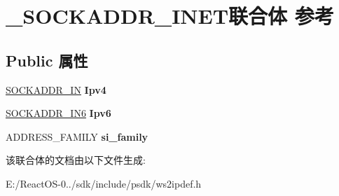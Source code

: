 \hypertarget{union___s_o_c_k_a_d_d_r___i_n_e_t}{}\section{\+\_\+\+S\+O\+C\+K\+A\+D\+D\+R\+\_\+\+I\+N\+E\+T联合体 参考}
\label{union___s_o_c_k_a_d_d_r___i_n_e_t}
\subsection*{Public 属性}
\begin{DoxyCompactItemize}
\item 
\mbox{\label{union___s_o_c_k_a_d_d_r___i_n_e_t_a7d04e6a93115bb74b94e188dc498d421}} 
\hyperlink{structsockaddr__in}{S\+O\+C\+K\+A\+D\+D\+R\+\_\+\+IN} {\bfseries Ipv4}
\item 
\mbox{\label{union___s_o_c_k_a_d_d_r___i_n_e_t_a9b4261176e7c2a4970401d363225207d}} 
\hyperlink{structsockaddr__in6}{S\+O\+C\+K\+A\+D\+D\+R\+\_\+\+I\+N6} {\bfseries Ipv6}
\item 
\mbox{\label{union___s_o_c_k_a_d_d_r___i_n_e_t_aef378ef11d88de42977a25c71e2a625a}} 
A\+D\+D\+R\+E\+S\+S\+\_\+\+F\+A\+M\+I\+LY {\bfseries si\+\_\+family}
\end{DoxyCompactItemize}


该联合体的文档由以下文件生成\+:\begin{DoxyCompactItemize}
\item 
E\+:/\+React\+O\+S-\/0../sdk/include/psdk/ws2ipdef.\+h\end{DoxyCompactItemize}
